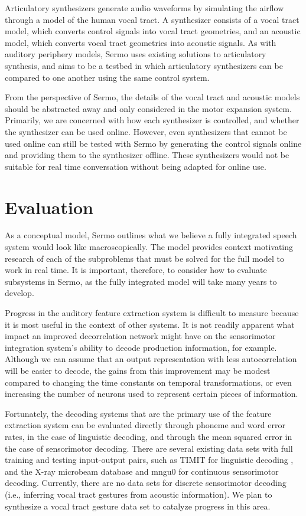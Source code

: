 Articulatory synthesizers
generate audio waveforms
by simulating the airflow
through a model of the human vocal tract.
A synthesizer consists of a vocal tract model,
which converts control signals
into vocal tract geometries,
and an acoustic model,
which converts vocal tract geometries
into acoustic signals.
As with auditory periphery models,
Sermo uses existing solutions
to articulatory synthesis,
and aims to be a testbed
in which articulatory synthesizers
can be compared to one another
using the same control system.

From the perspective of Sermo,
the details of the vocal tract
and acoustic models
should be abstracted away
and only considered
in the motor expansion system.
Primarily, we are concerned with
how each synthesizer is controlled,
and whether the synthesizer
can be used online.
However, even synthesizers
that cannot be used online
can still be tested with Sermo
by generating the control signals online
and providing them to the synthesizer offline.
These synthesizers would not be suitable
for real time conversation without
being adapted for online use.

\section{Evaluation}

As a conceptual model,
Sermo outlines what we believe a fully integrated
speech system would look like macroscopically.
The model provides context
motivating research of each
of the subproblems that must be solved
for the full model to work in real time.
It is important, therefore,
to consider how to evaluate
subsystems in Sermo,
as the fully integrated model
will take many years to develop.

Progress in the auditory feature extraction system
is difficult to measure
because it is most useful
in the context of other systems.
It is not readily apparent
what impact
an improved decorrelation network
might have on the sensorimotor integration
system's ability to decode production information,
for example.
Although we can assume that
an output representation with
less autocorrelation
will be easier to decode,
the gains from this improvement
may be modest compared to
changing the time constants on temporal transformations,
or even increasing the number of neurons
used to represent certain pieces of information.

Fortunately, the decoding systems
that are the primary use
of the feature extraction system
can be evaluated directly
through phoneme and word error rates,
in the case of linguistic decoding,
and through the mean squared error
in the case of sensorimotor decoding.
There are several existing data sets
with full training and testing
input-output pairs,
such as TIMIT for linguistic decoding
\cite{garofolo1993},
and the X-ray microbeam database \cite{westbury1990}
and mngu0 \cite{steiner2012}
for continuous sensorimotor decoding.
Currently, there are no data sets
for discrete sensorimotor decoding
(i.e., inferring vocal tract gestures
from acoustic information).
We plan to synthesize a
vocal tract gesture
data set to catalyze progress
in this area.

